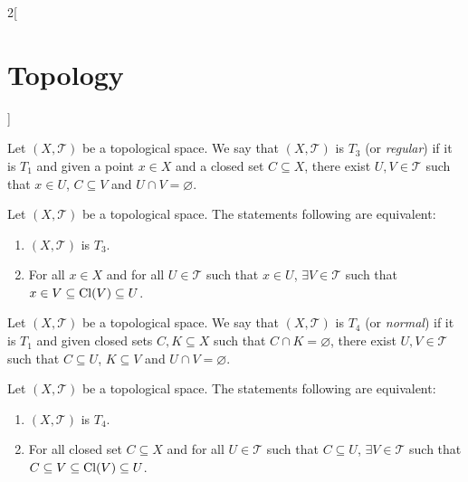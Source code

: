 \documentclass[../../../main.tex]{subfiles}
\begin{document}
\begin{multicols}{2}[\section{Topology}]
\begin{theorem}
  \end{theorem}
  \begin{definition}[$T_3$ space]
    Let $(X,\mathcal{T})$ be a topological space. We say that $(X,\mathcal{T})$ is $T_3$ (or \textit{regular}) if it is $T_1$ and given a point $x\in X$ and a closed set $C\subseteq X$, there exist $U,V\in\mathcal{T}$ such that $x\in U$, $C\subseteq V$ and $U\cap V=\varnothing$.
  \end{definition}
  \begin{theorem}
    Let $(X,\mathcal{T})$ be a topological space. The statements following are equivalent:
    \begin{enumerate}
      \item $(X,\mathcal{T})$ is $T_3$.
      \item For all $x\in X$ and for all $U\in\mathcal{T}$ such that $x\in U$, $\exists V\in\mathcal{T}$ such that $x\in V\subseteq\operatorname{Cl}(V)\subseteq U$.
    \end{enumerate}
  \end{theorem}
  \begin{definition}[$T_4$ space]
    Let $(X,\mathcal{T})$ be a topological space. We say that $(X,\mathcal{T})$ is $T_4$ (or \textit{normal}) if it is $T_1$ and given closed sets $C,K\subseteq X$ such that $C\cap K=\varnothing$, there exist $U,V\in\mathcal{T}$ such that $C\subseteq U$, $K\subseteq V$ and $U\cap V=\varnothing$.
  \end{definition}
  \begin{theorem}
    Let $(X,\mathcal{T})$ be a topological space. The statements following are equivalent:
    \begin{enumerate}
      \item $(X,\mathcal{T})$ is $T_4$.
      \item For all closed set $C\subseteq X$ and for all $U\in\mathcal{T}$ such that $C\subseteq U$, $\exists V\in\mathcal{T}$ such that $C\subseteq V\subseteq\operatorname{Cl}(V)\subseteq U$.
    \end{enumerate}
  \end{theorem}
\end{multicols}
\end{document}
